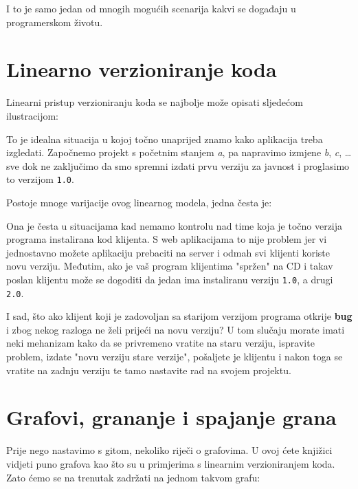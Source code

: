 I to je samo jedan od mnogih mogućih scenarija kakvi se događaju u programerskom životu.

\section*{Linearno verzioniranje koda}

Linearni pristup verzioniranju koda se najbolje može opisati sljedećom ilustracijom:



To je idealna situacija u kojoj točno unaprijed znamo kako aplikacija treba izgledati. 
Započnemo projekt s početnim stanjem \emph a, pa napravimo izmjene \emph b, \emph c, \dots sve dok ne zaključimo da smo spremni izdati prvu verziju za javnost i proglasimo to verzijom \texttt{1.0}. 

Postoje mnoge varijacije ovog linearnog modela, jedna česta je:



Ona je česta u situacijama kad nemamo kontrolu nad time koja je točno verzija programa instalirana kod klijenta. 
S web aplikacijama to nije problem jer vi jednostavno možete aplikaciju prebaciti na server i odmah svi klijenti koriste novu verziju.
Međutim, ako je vaš program klijentima "spržen" na CD i takav poslan klijentu može se dogoditi da jedan ima instaliranu verziju \texttt{1.0}, a drugi \texttt{2.0}.

I sad, što ako klijent koji je zadovoljan sa starijom verzijom programa otkrije \textbf{bug} i zbog nekog razloga ne želi prijeći na novu verziju?
U tom slučaju morate imati neki mehanizam kako da se privremeno vratite na staru verziju, ispravite problem, izdate "novu verziju stare verzije", pošaljete je klijentu i nakon toga se vratite na zadnju verziju te tamo nastavite rad na svojem projektu.

\section*{Grafovi, grananje i spajanje grana}

Prije nego nastavimo s gitom, nekoliko riječi o grafovima. 
U ovoj ćete knjižici vidjeti puno grafova kao što su u primjerima s linearnim verzioniranjem koda. 
Zato ćemo se na trenutak zadržati na jednom takvom grafu:

